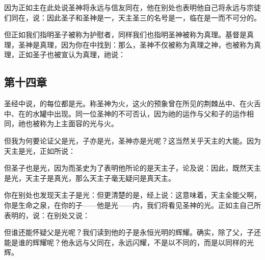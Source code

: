 因为正如主在此处说圣神将永远与信友同在，他在别处也表明他自己将永远与宗徒们同在，说：因此圣子和圣神是一，天主圣三的名号是一，临在是一而不可分的。\par

但正如我们指明圣子被称为护慰者，同样我们也指明圣神被称为真理。基督是真理，圣神是真理，因为你在中找到：那么，圣神不仅被称为真理之神，也被称为真理，正如圣子也被宣认为真理，祂说：\par


\subsection{第十四章}

圣经中说，的每位都是光。称圣神为火，这火的预象曾在所见的荆棘丛中、在火舌中、在的水罐中出现。同一位圣神的不可否认，因为祂的运作与父和子的运作相同，祂也被称为上主面容的光与火。\par

但我为何要论证父是光，子亦是光，圣神亦是光呢？这当然关乎天主的大能。因为天主是光，正如所说：\par

但圣子也是光，因为而圣史为了表明他所论的是天主子，论及说：因此，既然天主是光，天主子是真光，那么天主子毫无疑问是真天主。\par

你在别处也发现天主子是光：但更清楚的是，经上说：这意味着，天主全能父啊，你是生命之泉，在你的子——他是光——内，我们将看见圣神的光。正如主自己所表明的，说：在别处又说：\par

但谁还能怀疑父是光呢？我们读到他的子是永恒光明的辉耀。确实，除了父，子还能是谁的辉耀呢？他永远与父同在，永远闪耀，不是以不同的，而是以同样的光辉。\par

